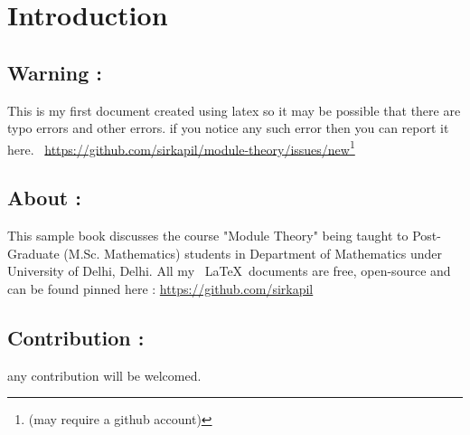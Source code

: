 \documentclass{tufte-book}
\theoremstyle{definition}
\theoremstyle{theorem}
\numberwithin{equation}{chapter}
\begin{document}
\chapter*{Introduction}
\section{Warning :}
This is my first document created using latex so it may be possible that there are typo errors and other errors. if you notice any such error then you can report it here.\newline
\ \url{https://github.com/sirkapil/module-theory/issues/new}\footnote{(may require a github account)}
\section{About :}
This sample book discusses the course "Module Theory" being taught to Post-Graduate (M.Sc. Mathematics) students in Department of Mathematics under University of Delhi, Delhi.\newline\bigskip
All my \ \LaTeX \ documents are free, open-source and can be found pinned here :\newline
\url{https://github.com/sirkapil} 

\section{Contribution :}
any contribution will be welcomed.


\mainmatter


\backmatter

\end{document}
